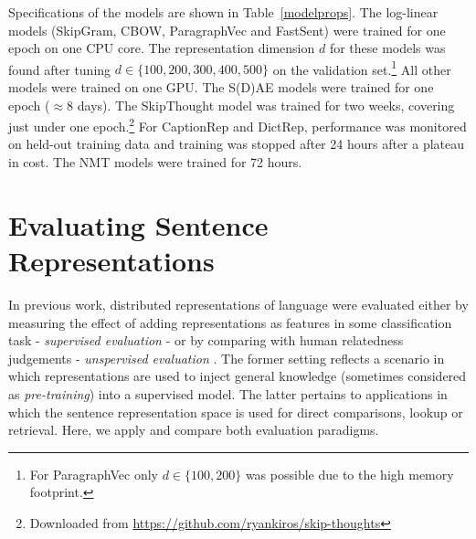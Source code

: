 \documentclass[11pt,letterpaper]{article}
\begin{document}
Specifications of the models are shown in Table~\ref{modelprops}. The log-linear models (SkipGram, CBOW, ParagraphVec and FastSent) were trained for one epoch on one CPU core. The representation dimension \(d\) for these models was found after tuning \(d \in \{100,200,300,400,500\}\) on the validation set.\footnote{For ParagraphVec only \(d \in\{100,200\}\) was possible due to the high memory footprint.} All other models were trained on one GPU. The S(D)AE models were trained for one epoch (\(\approx8\) days). The SkipThought model was trained for two weeks, covering just under one epoch.\footnote{Downloaded from {\scriptsize \url{https://github.com/ryankiros/skip-thoughts}}} For CaptionRep and DictRep, performance was monitored on held-out training data and training was stopped after 24 hours after a plateau in cost. The NMT models were trained for 72 hours. 

\section{Evaluating Sentence Representations}

In previous work, distributed representations of language were evaluated either by measuring the effect of adding representations as features in some classification task - \emph{supervised evaluation} \cite{collobert2011natural,mikolov2013efficient,kiros2015skip} - or by comparing with human relatedness judgements - \emph{unspervised evaluation} \cite{hill2015learning,baroni2014don,levy2015improving}. The former setting reflects a scenario in which representations are used to inject general knowledge (sometimes considered as \emph{pre-training}) into a supervised model. The latter pertains to applications in which the sentence representation space is used for direct comparisons, lookup or retrieval. Here, we apply and compare both evaluation paradigms.  
\end{document}
